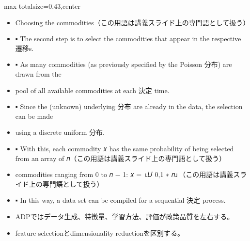 \clearpage
{}
\begin{minipage}[t]{0.405\textwidth}
\begin{adjustbox}{max totalsize={\textwidth}{0.43\textheight},center}
\begin{minipage}{\textwidth}\scriptsize
{}\begin{itemize}
\item Choosing the commodities（この用語は講義スライド上の専門語として扱う）
\item ▪ The second step is to select the commodities that appear in the respective 遷移s.
\item ▪ As many commodities (as previously specified by the Poisson 分布) are drawn from the
\item pool of all available commodities at each 決定 time.
\item ▪ Since the (unknown) underlying 分布 are already in the data, the selection can be made
\item using a discrete uniform 分布.
\item ▪ With this, each commodity 𝑥 has the same probability of being selected from an array of 𝑛（この用語は講義スライド上の専門語として扱う）
\item commodities ranging from 0 to 𝑛 − 1: 𝑥 = ⌊𝑈 0,1 ∗ 𝑛⌋（この用語は講義スライド上の専門語として扱う）
\item ▪ In this way, a data set can be compiled for a sequential 決定 process.
\end{itemize}\begin{itemize}
\item ADPではデータ生成、特徴量、学習方法、評価が政策品質を左右する。
\item feature selectionとdimensionality reductionを区別する。
\end{itemize}
\end{minipage}
\end{adjustbox}
\end{minipage}\hfill
